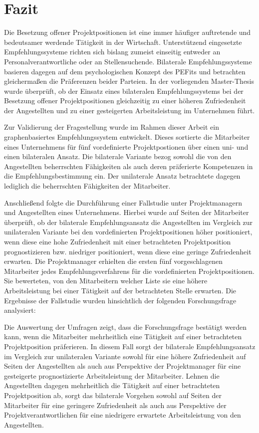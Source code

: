 \chapter{Fazit}
\label{ch:fazit}
Die Besetzung offener Projektpositionen ist eine immer häufiger auftretende und bedeutsamer werdende Tätigkeit in der Wirtschaft. Unterstützend eingesetzte Empfehlungssysteme richten sich bislang zumeist einseitig entweder an Personalverantwortliche oder an Stellensuchende. Bilaterale Empfehlungssysteme basieren dagegen auf dem psychologischen Konzept des \aclp{PEFit} und betrachten gleichermaßen die Präferenzen beider Parteien. In der vorliegenden Master-Thesis wurde überprüft, ob der Einsatz eines bilateralen Empfehlungssystems bei der Besetzung offener Projektpositionen gleichzeitig zu einer höheren Zufriedenheit der Angestellten und zu einer gesteigerten Arbeitsleistung im Unternehmen führt. 

Zur Validierung der Fragestellung wurde im Rahmen dieser Arbeit ein graphenbasiertes Empfehlungssystem entwickelt. Dieses sortierte die Mitarbeiter eines Unternehmens für fünf vordefinierte Projektpostionen über einen uni- und einen bilateralen Ansatz. Die bilaterale Variante bezog sowohl die von den Angestellten beherrschten Fähigkeiten als auch deren präferierte Kompetenzen in die Empfehlungsbestimmung ein. Der unilaterale Ansatz betrachtete dagegen lediglich die beherrschten Fähigkeiten der Mitarbeiter.

Anschließend folgte die Durchführung einer Fallstudie unter Projektmanagern und Angestellten eines Unternehmens. Hierbei wurde auf Seiten der Mitarbeiter überprüft, ob der bilaterale Empfehlungsansatz die Angestellten im Vergleich zur unilateralen Variante bei den vordefinierten Projektpositionen höher positioniert, wenn diese eine hohe Zufriedenheit mit einer betrachteten Projektposition prognostizieren bzw. niedriger positioniert, wenn diese eine geringe Zufriedenheit erwarten. Die Projektmanager erhielten die ersten fünf vorgeschlagenen Mitarbeiter jedes Empfehlungsverfahrens für die vordefinierten Projektpositionen. Sie bewerteten, von den Mitarbeitern welcher Liste sie eine höhere Arbeitsleistung bei einer Tätigkeit auf der betrachteten Stelle erwarten. Die Ergebnisse der Fallstudie wurden hinsichtlich der folgenden Forschungsfrage analysiert: \forschungsfrage

Die Auswertung der Umfragen zeigt, dass die Forschungsfrage bestätigt werden kann, wenn die Mitarbeiter mehrheitlich eine Tätigkeit auf einer betrachteten Projektposition präferieren. In diesem Fall sorgt der bilaterale Empfehlungsansatz im Vergleich zur unilateralen Variante sowohl für eine höhere Zufriedenheit auf Seiten der Angestellten als auch aus Perspektive der Projektmanager für eine gesteigerte prognostizierte Arbeitsleistung der Mitarbeiter. Lehnen die Angestellten dagegen mehrheitlich die Tätigkeit auf einer betrachteten Projektposition ab, sorgt das bilaterale Vorgehen sowohl auf Seiten der Mitarbeiter für eine geringere Zufriedenheit als auch aus Perspektive der Projektverantwortlichen für eine niedrigere erwartete Arbeitsleistung von den Angestellten.

